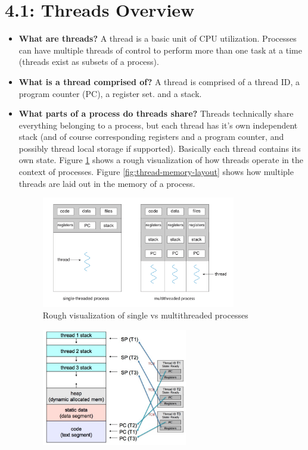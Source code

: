 \documentclass[12pt]{article}
\begin{document}
\section*{4.1: Threads Overview}

\begin{itemize}
    \item \textbf{What are threads?} A thread is a basic unit of CPU utilization. Processes can have multiple threads of control to perform more than one task at a time (threads exist as subsets of a process).
    \item \textbf{What is a thread comprised of?} A thread is comprised of a thread ID, a program counter (PC), a register set. and a stack.
    \item \textbf{What parts of a process do threads share?} Threads technically share everything belonging to a process, but each thread has it's own independent stack (and of course corresponding registers and a program counter, and possibly thread local storage if supported). Basically each thread contains its own state. Figure \ref{fig:thread-process} shows a rough visualization of how threads operate in the context of processes. Figure \ref{fig:thread-memory-layout} shows how multiple threads are laid out in the memory of a process.
        \begin{figure}[ht]
            \centering
            \includegraphics[width=0.8\textwidth]{figures/thread-process.jpg}
            \caption{Rough visualization of single vs multithreaded processes}
            \label{fig:thread-process}
        \end{figure}
        \begin{figure}[ht]
            \centering
            \includegraphics[width=0.6\textwidth]{figures/thread-memory-layout.jpg}

\end{figure}
\end{itemize}
\end{document}
